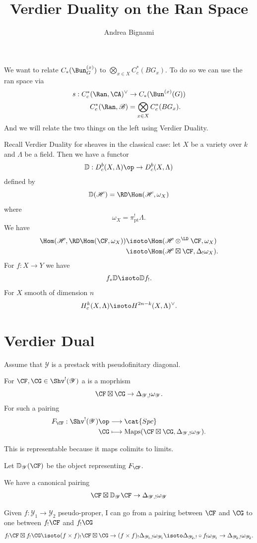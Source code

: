 \documentclass[oneside]{amsart}
\title{Verdier Duality on the Ran Space}
\author{Andrea Bignami}
\newcommand{\Spc}{\cat{Spc}}
\newcommand{\CB}{\mathcal{B}}
\newcommand{\CY}{\mathcal{Y}}
\renewcommand{\CH}{\mathcal{H}}
\DeclareMathOperator{\Maps}{Maps}
\newcommand{\VD}{\mathbb{D}}
\begin{document}
\maketitle

We want to relate $C_*(\Bun^{(x)}_G)$ to $\bigotimes_{x\in X}C^{*}_c(BG_x)$. To do so we can use the ran space via
\begin{align*}
	s:C^{*}_c(\Ran,\CA)^{\vee} &\to C_*(\Bun^{(x)}(G)) \\
	C_c^{*}(\Ran, \CB) &= \bigotimes_{x\in X}C^{*}_c(BG_x).
\end{align*}
And we will relate the two things on the left using Verdier Duality.

Recall Verdier Duality for sheaves in the classical case: let $X$ be a variety over $k$ and $\Lambda$ be a field. Then we have a functor
\[
\VD:D^{b}_c(X,\Lambda)\op \to D_c^{b}(X,\Lambda)
\] 
defined by
\[
\VD(\CH) = \RD\Hom(\CH,\omega_X)
\] 
where
\[
\omega_X = \pi_{\text{pt}}^{!}\Lambda.
\]
We have
\begin{align*}
	\Hom(\CH,\RD\Hom(\CF,\omega_X)) &\isoto \Hom(\CH\otimes^{\LD}\CF,\omega_X) \\
					&\isoto \Hom(\CH\boxtimes\CF,\Delta_!\omega_X).
\end{align*}
For $f:X\to Y$ we have 
\[
f_*\VD \isoto \VD f_!.
\] 
For $X$ smooth of dimension $n$ 
\[
H_c^{k}(X,\Lambda) \isoto H^{2n-k}(X,\Lambda)^{\vee}.
\]

\section{Verdier Dual}
Assume that $\CY$ is a prestack with pseudofinitary diagonal.

\begin{definition}
	For $\CF,\CG\in \Shv^{!}(\CY)$ a  is a moprhism
	\[
		\CF\boxtimes \CG \to \Delta_{\CY,!}\omega_\CY.
	\] 
	For such a pairing
	\begin{align*}
		F_\CF: \Shv^{!}(\CY)\op &\longrightarrow \Spc \\
		\CG &\longmapsto \Maps(\CF\boxtimes \CG,\Delta_{\CY,!}\omega_\CY).
	\end{align*}
\end{definition}
This is representable because it maps colimits to limits.

\begin{definition}
	Let $\VD_\CY(\CF)$ be the object representing $F_\CF$.
\end{definition}
\begin{remark}
	We have a canonical pairing
	\[
	\CF \boxtimes \VD_\CY\CF \to \Delta_{\CY,!}\omega_\CY
	\] 
\end{remark}
Given $f:\CY_1\to \CY_2$ pseudo-proper, I can go from a pairing between $\CF$ and $\CG$ to one between $f_!\CF$ and $f_!\CG$
\[
f_!\CF \boxtimes f_!\CG \isoto (f\times f)_!\CF\boxtimes\CG \to (f\times f)_!\Delta_{\CY_1,!}\omega_{\CY_1} \isoto \Delta_{\CY_2,!}\circ f_! \omega_{\CY_1} \to \Delta_{\CY_2,!}\omega_{\CY_2}.
\] 
\end{document}
